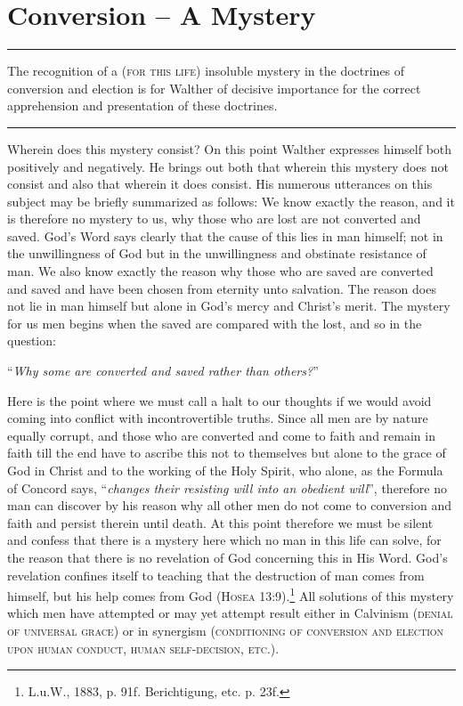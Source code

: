 \chapter{Conversion -- A Mystery}
\hrule
\vspace{.30cm}
The recognition of a {\scriptsize\textsc{(for this life)}} insoluble mystery in the doctrines of conversion and election is for Walther of decisive importance for the correct apprehension and presentation of these doctrines.
\vspace{.30cm}
\hrule
\vspace{1.25cm}
                Wherein does this mystery consist?  On this point Walther expresses himself both positively and negatively.  He brings out both that wherein this mystery does not consist and also that wherein it does consist.  His numerous utterances on this subject may be briefly summarized as follows: We know exactly the reason, and it is therefore no mystery to us, why those who are lost are not converted and saved.  God’s Word says clearly that the cause of this lies in man himself; not in the unwillingness of God but in the unwillingness and obstinate resistance of man.  We also know exactly the reason why those who are saved are converted and saved and have been chosen from eternity unto salvation.  The reason does not lie in man himself but alone in God’s mercy and Christ’s merit.  The mystery for us men begins when the saved are compared with the lost, and so in the question: \begin{displayquote}“\textit{Why some are converted and saved rather than others?}”\end{displayquote} Here is the point where we must call a halt to our thoughts if we would avoid coming into conflict with incontrovertible truths.  Since all men are by nature equally corrupt, and those who are converted and come to faith and remain in faith till the end have to ascribe this not to themselves but alone to the grace of God in Christ and to the working of the Holy Spirit, who alone, as the Formula of Concord says, “\textit{changes their resisting will into an obedient will}”, therefore no man can discover by his reason why all other men do not come to conversion and faith and persist therein until death.  At this point therefore we must be silent and confess that there is a mystery here which no man in this life can solve, for the reason that there is no revelation of God concerning this in His Word.  God’s revelation confines itself to teaching that the destruction of man comes from himself, but his help comes from God {\scriptsize\textsc{(Hosea 13:9)}}.\footnote{L.u.W., 1883, p. 91f. Berichtigung, etc. p. 23f.}  All solutions of this mystery which men have attempted or may yet attempt result either in Calvinism {\scriptsize\textsc{(denial of universal grace)}} or in synergism {\scriptsize\textsc{(conditioning of conversion and election upon human conduct, human self-decision, etc.)}}.

